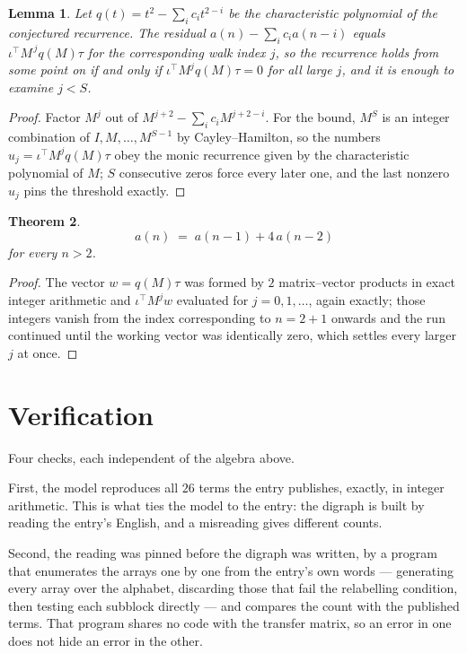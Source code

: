 \documentclass[11pt,a4paper]{article}
\theoremstyle{plain}
\newtheorem{theorem}{Theorem}
\newtheorem{lemma}[theorem]{Lemma}
\theoremstyle{definition}
\begin{document}
\begin{lemma}\label{lem:crit}
Let $q(t)=t^{2}-\sum_i c_it^{2-i}$ be the characteristic polynomial of the
conjectured recurrence. The residual $a(n)-\sum_ic_ia(n-i)$ equals
$\iota^{\!\top}M^{\,j}q(M)\tau$ for the corresponding walk index $j$, so the recurrence
holds from some point on if and only if $\iota^{\!\top}M^{j}q(M)\tau=0$ for all large $j$,
and it is enough to examine $j<S$.
\end{lemma}

\begin{proof}
Factor $M^{j}$ out of $M^{j+2}-\sum_ic_iM^{j+2-i}$. For the bound, $M^{S}$
is an integer combination of $I,M,\dots,M^{S-1}$ by Cayley--Hamilton, so the numbers
$u_j=\iota^{\!\top}M^{j}q(M)\tau$ obey the monic recurrence given by the characteristic
polynomial of $M$; $S$ consecutive zeros force every later one, and the last nonzero $u_j$
pins the threshold exactly.
\end{proof}

\begin{theorem}
\[
a(n)\;=\;a(n-1) + 4\,a(n-2)
\]
for every $n>2$.
\end{theorem}

\begin{proof}
The vector $w=q(M)\tau$ was formed by $2$ matrix--vector products in exact integer
arithmetic and $\iota^{\!\top}M^{j}w$ evaluated for $j=0,1,\dots$, again exactly; those
integers vanish from the index corresponding to $n=2+1$ onwards and the run continued
until the working vector was identically zero, which settles every larger $j$ at once.
\end{proof}

\section{Verification}

Four checks, each independent of the algebra above.

First, the model reproduces all $26$ terms the entry publishes, exactly, in integer
arithmetic. This is what ties the model to the entry: the digraph is built by reading the
entry's English, and a misreading gives different counts.

Second, the reading was pinned before the digraph was written, by a program that enumerates
the arrays one by one from the entry's own words --- generating every array over the
alphabet, discarding those that fail the relabelling condition, then testing each subblock
directly --- and compares the count with the published terms. That program shares no code
with the transfer matrix, so an error in one does not hide an error in the other.
\end{document}
